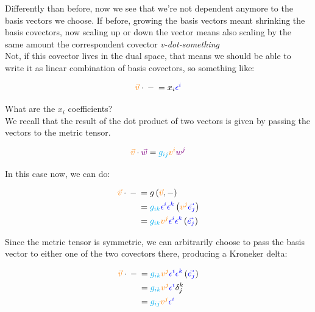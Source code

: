 Differently than before, now we see that we're not dependent anymore to the basis vectors we choose.
If before, growing the basis vectors meant shrinking the basis covectors, now scaling up or down the vector means also
scaling by the same amount the correspondent covector \textit{v-dot-something}\\

Not, if this covector lives in the dual space, that means we should be able to write it 
as linear combination of basis covectors, so something like:

\begin{equation}
    \begingroup\color{orange}\vec{v}\endgroup \cdot  {{} - {}} = x_i \begingroup\color{blue}\epsilon^i\endgroup
\end{equation}

What are the $x_i$ coefficients?\\
We recall that the result of the dot product of two vectors is given by passing the vectors to the metric
tensor. 

\begin{align*}
    \begingroup\color{orange}\vec{v}\endgroup \cdot \begingroup\color{violet}\vec{w}\endgroup = \begingroup\color{cyan}g_{ij}\endgroup \begingroup\color{orange}v^i\endgroup \begingroup\color{violet}w^j\endgroup
\end{align*}

In this case now, we can do:

\begin{align*}
    \begingroup\color{orange}\vec{v}\endgroup \cdot  {{} - {}} &= 
    g\left(\begingroup\color{orange}\vec{v}\endgroup, -\right)\\ 
    &= \begingroup\color{cyan}g_{ik}\endgroup \begingroup\color{blue}\epsilon^i\epsilon^k\endgroup \left(\begingroup\color{orange}v^j\endgroup \begingroup\color{blue}\vec{e_j}\endgroup\right)\\ 
    &= \begingroup\color{cyan}g_{ik}\endgroup \begingroup\color{orange}v^j\endgroup \begingroup\color{blue}\epsilon^i\epsilon^k\endgroup \left( \begingroup\color{blue}\vec{e_j}\endgroup\right)
\end{align*}

Since the metric tensor is symmetric, we can arbitrarily choose to pass the basis vector to either one of the two covectors there, producing 
a Kroneker delta:

\begin{align*}
    \begingroup\color{orange}\vec{v}\endgroup \cdot  {{} - {}} &= 
    \begingroup\color{cyan}g_{ik}\endgroup \begingroup\color{orange}v^j\endgroup \begingroup\color{blue}\epsilon^i\epsilon^k\endgroup \left( \begingroup\color{blue}\vec{e_j}\endgroup\right)\\
    &= \begingroup\color{cyan}g_{ik}\endgroup \begingroup\color{orange}v^j\endgroup \begingroup\color{blue}\epsilon^i\endgroup \delta^k_j\\
    &= \begingroup\color{cyan}g_{ij}\endgroup \begingroup\color{orange}v^j\endgroup \begingroup\color{blue}\epsilon^i\endgroup
\end{align*}

